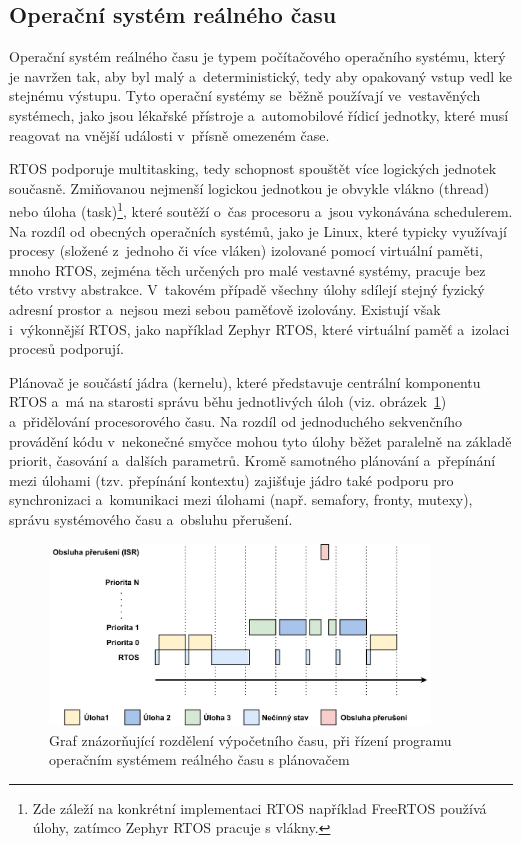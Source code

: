 \subsection{Operační systém reálného času}
Operační systém reálného času je typem počítačového operačního systému, který je navržen tak, aby byl malý a~deterministický, tedy aby opakovaný vstup vedl ke stejnému výstupu. Tyto operační systémy se~běžně používají ve~vestavěných systémech, jako jsou lékařské přístroje a~automobilové řídicí jednotky, které musí reagovat na vnější události v~přísně omezeném čase.~\cite{freertos_what_is_rtos}

RTOS podporuje multitasking, tedy schopnost spouštět více logických jednotek současně. Zmiňovanou nejmenší logickou jednotkou je obvykle vlákno (thread) nebo úloha (task)\footnote{Zde záleží na konkrétní implementaci RTOS například FreeRTOS používá úlohy, zatímco Zephyr RTOS pracuje s vlákny.}, které soutěží o~čas procesoru a~jsou vykonávána schedulerem. Na rozdíl od obecných operačních systémů, jako je Linux, které typicky využívají procesy (složené z~jednoho či více vláken) izolované pomocí virtuální paměti, mnoho RTOS, zejména těch určených pro malé vestavné systémy, pracuje bez této vrstvy abstrakce. V~takovém případě všechny úlohy sdílejí stejný fyzický adresní prostor a~nejsou mezi sebou paměťově izolovány. Existují však i~výkonnější RTOS, jako například Zephyr RTOS, které virtuální paměť a~izolaci procesů podporují.~\cite{freertos_what_is_rtos}

Plánovač je součástí jádra (kernelu), které představuje centrální komponentu RTOS a~má na starosti správu běhu jednotlivých úloh (viz. obrázek~\ref{fig:rtos-scheduling}) a~přidělování procesorového času. Na rozdíl od jednoduchého sekvenčního provádění kódu v~nekonečné smyčce mohou tyto úlohy běžet paralelně na základě priorit, časování a~dalších parametrů. Kromě samotného plánování a~přepínání mezi úlohami (tzv. přepínání kontextu) zajišťuje jádro také podporu pro synchronizaci a~komunikaci mezi úlohami (např. semafory, fronty, mutexy), správu systémového času a~obsluhu přerušení.~\cite{freertos_book}

\begin{figure}[h]
    \centering
    \includegraphics[width=0.90\textwidth]{obrazky-figures/rtos_scheduling.pdf}
    
    \caption{Graf znázorňující rozdělení výpočetního času, při řízení programu operačním systémem reálného času s plánovačem~\cite{freertos_book}}
    \label{fig:rtos-scheduling}
\end{figure}

